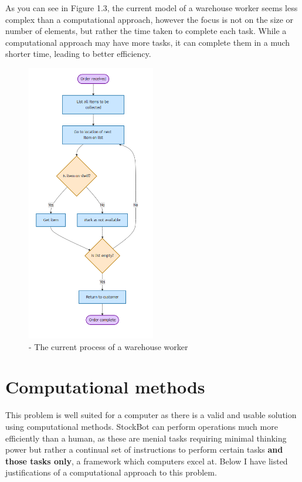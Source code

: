 \newpage

As you can see in Figure 1.3, the current model of a warehouse worker seems less complex than a computational approach, however the focus is not on the size or number of elements, but rather the time taken to complete each task. While a computational approach may have more tasks, it can complete them in a much shorter time, leading to better efficiency.

\begin{figure}[h] 
\centering    
\includegraphics[width=0.5\textwidth]{CurrentSysModel.png}
\caption{- The current process of a warehouse worker}
\label{The current process of a warehouse worker}
\end{figure}


\section{Computational methods}

This problem is well suited for a computer as there is a valid and usable solution using computational methods. StockBot can perform operations much more efficiently than a human, as these are menial tasks requiring minimal thinking power but rather a continual set of instructions to perform certain tasks \textbf{and those tasks only}, a framework which computers excel at. Below I have listed justifications of a computational approach to this problem.

